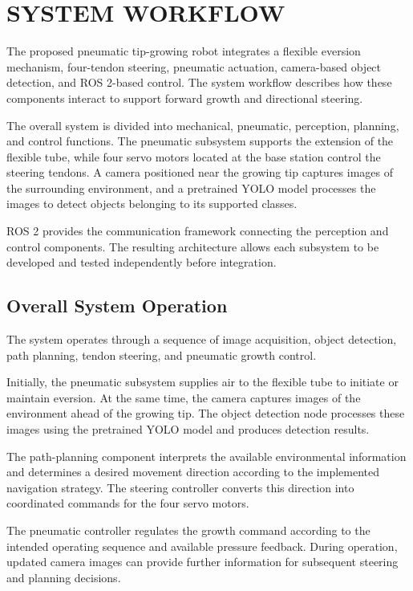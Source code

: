 \chapter{SYSTEM WORKFLOW}

The proposed pneumatic tip-growing robot integrates a flexible eversion mechanism, four-tendon steering, pneumatic actuation, camera-based object detection, and ROS 2-based control. The system workflow describes how these components interact to support forward growth and directional steering.

The overall system is divided into mechanical, pneumatic, perception, planning, and control functions. The pneumatic subsystem supports the extension of the flexible tube, while four servo motors located at the base station control the steering tendons. A camera positioned near the growing tip captures images of the surrounding environment, and a pretrained YOLO model processes the images to detect objects belonging to its supported classes.

ROS 2 provides the communication framework connecting the perception and control components. The resulting architecture allows each subsystem to be developed and tested independently before integration.

\section{Overall System Operation}

The system operates through a sequence of image acquisition, object detection, path planning, tendon steering, and pneumatic growth control.

Initially, the pneumatic subsystem supplies air to the flexible tube to initiate or maintain eversion. At the same time, the camera captures images of the environment ahead of the growing tip. The object detection node processes these images using the pretrained YOLO model and produces detection results.

The path-planning component interprets the available environmental information and determines a desired movement direction according to the implemented navigation strategy. The steering controller converts this direction into coordinated commands for the four servo motors.

The pneumatic controller regulates the growth command according to the intended operating sequence and available pressure feedback. During operation, updated camera images can provide further information for subsequent steering and planning decisions.

